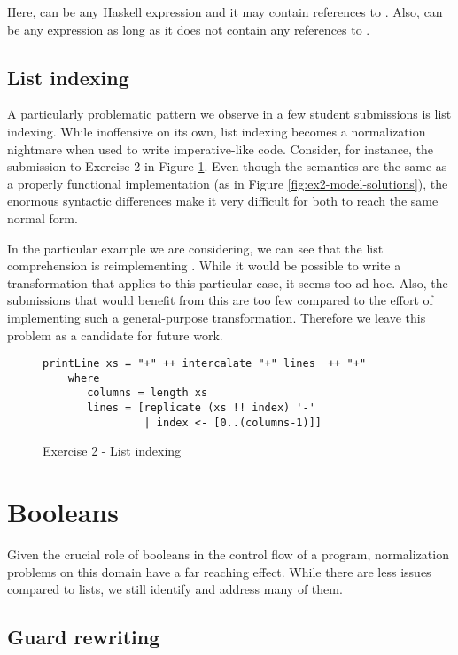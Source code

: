 Here,  can be any Haskell expression and it may contain references to . Also,  can be any expression as long as it does not contain any references to .

\subsection{List indexing}

A particularly problematic pattern we observe in a few student submissions is list indexing. While inoffensive on its own, list indexing becomes a normalization nightmare when used to write imperative-like code. Consider, for instance, the submission to Exercise 2 in Figure \ref{fig:ex2-list-indexing}. Even though the semantics are the same as a properly functional implementation (as in Figure \ref{fig:ex2-model-solutions}), the enormous syntactic differences make it very difficult for both to reach the same normal form.

In the particular example we are considering, we can see that the list comprehension is reimplementing . While it would be possible to write a transformation that applies to this particular case, it seems too ad-hoc. Also, the submissions that would benefit from this are too few compared to the effort of implementing such a general-purpose transformation. Therefore we leave this problem as a candidate for future work.


\begin{figure}
\centering
\begin{verbatim}
printLine xs = "+" ++ intercalate "+" lines  ++ "+"
    where
       columns = length xs
       lines = [replicate (xs !! index) '-'
                | index <- [0..(columns-1)]]
\end{verbatim}
\caption{Exercise 2 - List indexing}
\label{fig:ex2-list-indexing}
\end{figure}

\section{Booleans}

Given the crucial role of booleans in the control flow of a program, normalization problems on this domain have a far reaching effect. While there are less issues compared to lists, we still identify and address many of them.

\subsection{Guard rewriting}

